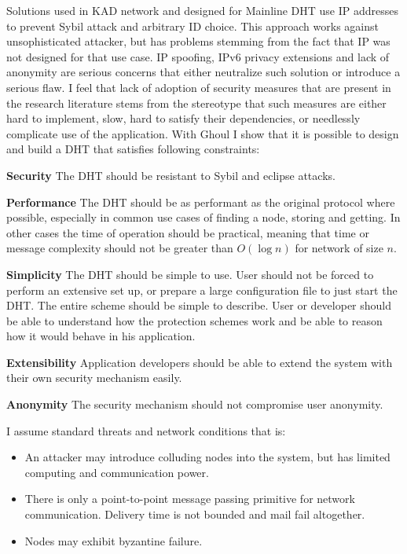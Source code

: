Solutions used in KAD network and designed for Mainline DHT use IP addresses to
prevent Sybil attack and arbitrary ID choice. This approach works against
unsophisticated attacker, but has problems stemming from the fact that IP was
not designed for that use case. IP spoofing, IPv6 privacy extensions and lack of
anonymity are serious concerns that either neutralize such solution or introduce
a serious flaw. I feel that lack of adoption of security measures that are
present in the research literature stems from the stereotype that such measures
are either hard to implement, slow, hard to satisfy their dependencies, or
needlessly complicate use of the application. With Ghoul I show that it is
possible to design and build a DHT that satisfies following constraints:

\begin{description}
  \item{\textbf{Security}} The DHT should be resistant to Sybil and
    eclipse attacks.
  \item{\textbf{Performance}} The DHT should be as performant as the original
    protocol where possible, especially in common use cases of finding a node,
    storing and getting. In other cases the time of operation should be
    practical, meaning that time or message complexity should not be greater
    than $O(\log n)$ for network of size $n$.
  \item{\textbf{Simplicity}} The DHT should be simple to use. User should not be
    forced to perform an extensive set up, or prepare a large configuration file
    to just start the DHT.  The entire scheme should be simple to describe. User
    or developer should be able to understand how the protection schemes work
    and be able to reason how it would behave in his application.
  \item{\textbf{Extensibility}} Application developers should be able to extend
    the system with their own security mechanism easily.
  \item{\textbf{Anonymity}} The security mechanism should not compromise user
    anonymity.
\end{description}

I assume standard threats and network conditions that is:

\begin{itemize}
  \item An attacker may introduce colluding nodes into the system, but has
    limited computing and communication power.
  \item There is only a point-to-point message passing primitive for network
    communication. Delivery time is not bounded and mail fail altogether.
  \item Nodes may exhibit byzantine failure.
\end{itemize}

